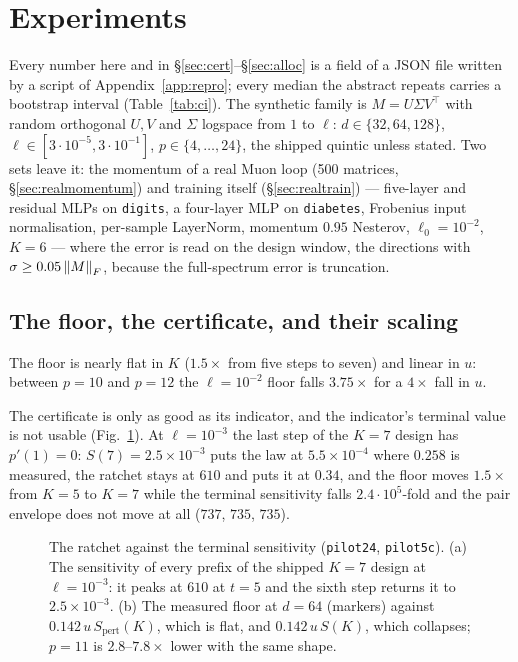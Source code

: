 \section{Experiments}
\label{sec:exp}

Every number here and in \S\ref{sec:cert}--\S\ref{sec:alloc} is a field of a JSON file
written by a script of Appendix~\ref{app:repro}; every median the abstract repeats carries
a bootstrap interval (Table~\ref{tab:ci}).  The synthetic family is $M = U\Sigma V^\top$
with random orthogonal $U,V$ and $\Sigma$ logspace from $1$ to $\ell$: $d\in\{32,64,128\}$,
$\ell\in[3\cdot10^{-5},3\cdot10^{-1}]$, $p\in\{4,\dots,24\}$, the shipped quintic unless
stated.  Two sets leave it: the momentum of a real Muon loop (500
matrices, \S\ref{sec:realmomentum}) and training itself (\S\ref{sec:realtrain}) ---
five-layer and residual MLPs on \texttt{digits}, a four-layer MLP on \texttt{diabetes},
Frobenius input normalisation, per-sample LayerNorm, momentum $0.95$ Nesterov,
$\ell_0=10^{-2}$, $K=6$ --- where the error is read on the design window, the directions
with $\sigma\ge0.05\left\lVert M \right\rVert_F$, because the full-spectrum error is truncation.

\subsection{The floor, the certificate, and their scaling}

The floor is nearly flat in $K$ ($1.5\times$ from five steps to seven) and linear in $u$:
between $p=10$ and $p=12$ the
$\ell=10^{-2}$ floor falls $3.75\times$ for a $4\times$ fall in $u$.

The certificate is only as good as its indicator, and the indicator's terminal value is
not usable (Fig.~\ref{fig:ratchet}).  At $\ell=10^{-3}$ the last step of the $K=7$ design
has $p'(1)=0$: $S(7)=2.5\times10^{-3}$ puts the law at $5.5\times10^{-4}$ where $0.258$ is
measured, the ratchet stays at $610$ and puts it at $0.34$, and the floor moves
$1.5\times$ from $K=5$ to $K=7$ while the terminal sensitivity falls $2.4\cdot10^{5}$-fold
and the pair envelope does not move at all ($737$, $735$, $735$).

\begin{figure}[t]
\centering

\caption{The ratchet against the terminal sensitivity (\texttt{pilot24}, \texttt{pilot5c}).
(a) The sensitivity of every prefix of the shipped $K=7$ design at $\ell=10^{-3}$: it peaks
at $610$ at $t=5$ and the sixth step returns it to $2.5\times10^{-3}$.  (b) The measured
floor at $d=64$ (markers) against $0.142\,u\,S_{\mathrm{pert}}(K)$, which is flat, and
$0.142\,u\,S(K)$, which collapses; $p=11$ is $2.8$--$7.8\times$ lower with the same shape.}
\label{fig:ratchet}
\end{figure}

